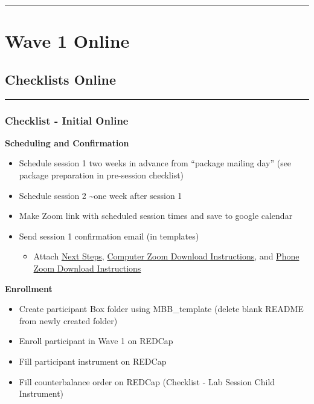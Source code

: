 \documentclass[]{book}
\providecommand{\tightlist}{%
  \setlength{\itemsep}{0pt}\setlength{\parskip}{0pt}}
\begin{document}
\begin{center}\rule{0.5\linewidth}{0.5pt}\end{center}

\hypertarget{wave-1-online}{%
\chapter{Wave 1 Online}\label{wave-1-online}}

\hypertarget{checklists-online}{%
\section{Checklists Online}\label{checklists-online}}

\begin{center}\rule{0.5\linewidth}{0.5pt}\end{center}

\hypertarget{checklist---initial-online}{%
\subsection{Checklist - Initial Online}\label{checklist---initial-online}}

\textbf{Scheduling and Confirmation}

\begin{itemize}
\tightlist
\item
  Schedule session 1 two weeks in advance from ``package mailing day'' (see package preparation in pre-session checklist)
\item
  Schedule session 2 \textasciitilde{}one week after session 1
\item
  Make Zoom link with scheduled session times and save to google calendar
\item
  Send session 1 confirmation email (in templates)

  \begin{itemize}
  \tightlist
  \item
    Attach \href{https://ucla.app.box.com/file/665452959932}{Next Steps}, \href{https://ucla.app.box.com/file/680632734387}{Computer Zoom Download Instructions}, and \href{https://ucla.app.box.com/file/680631353662}{Phone Zoom Download Instructions}
  \end{itemize}
\end{itemize}

\textbf{Enrollment}

\begin{itemize}
\tightlist
\item
  Create participant Box folder using MBB\_template (delete blank README from newly created folder)
\item
  Enroll participant in Wave 1 on REDCap
\item
  Fill participant instrument on REDCap
\item
  Fill counterbalance order on REDCap (Checklist - Lab Session Child Instrument)
\end{itemize}
\end{document}
